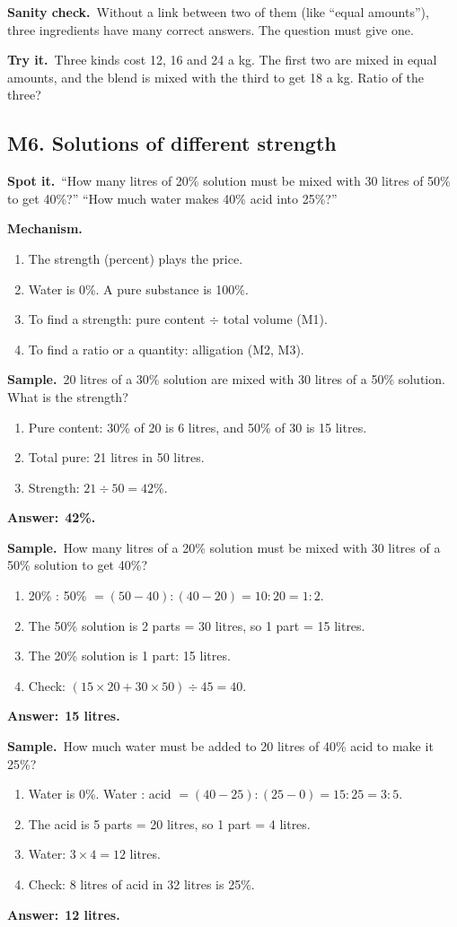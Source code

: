 \documentclass[11pt,a4paper]{article}
\let\oldsubsection\subsection
\renewcommand{\subsection}{\needspace{9\baselineskip}\oldsubsection}
\newcommand{\spot}{\textbf{\color{ember}Spot it.}\ }
\newcommand{\mech}{\textbf{\color{ember}Mechanism.}\ }
\newif\ifkeepsamp
\newcommand{\ans}[1]{\par\nopagebreak\noindent\textbf{\color{ember}Answer:}\ \textbf{#1}\par}
\newcommand{\samp}{\ifkeepsamp\needspace{4\baselineskip}\fi\textbf{\color{ember}Sample.}\ }
\newcommand{\sane}{\textbf{\color{slate}Sanity check.}\ }
\newcommand{\tryit}[1]{\textbf{\color{ember}Try it.}\ #1}
\begin{document}
\sane Without a link between two of them (like ``equal amounts''), three ingredients have many correct answers. The question must give one.

\tryit Three kinds cost 12, 16 and 24 a kg. The first two are mixed in equal amounts, and the blend is mixed with the third to get 18 a kg. Ratio of the three?

\subsection{M6. Solutions of different strength}
\spot ``How many litres of 20\% solution must be mixed with 30 litres of 50\% to get 40\%?'' ``How much water makes 40\% acid into 25\%?''

\mech
\begin{enumerate}
\item The strength (percent) plays the price.
\item Water is 0\%. A pure substance is 100\%.
\item To find a strength: pure content $\div$ total volume (M1).
\item To find a ratio or a quantity: alligation (M2, M3).
\end{enumerate}

\samp 20 litres of a 30\% solution are mixed with 30 litres of a 50\% solution. What is the strength?
\begin{enumerate}
\item Pure content: 30\% of 20 is 6 litres, and 50\% of 30 is 15 litres.
\item Total pure: 21 litres in 50 litres.
\item Strength: $21 \div 50 = 42\%$.
\end{enumerate}
\ans{42\%.}

\samp How many litres of a 20\% solution must be mixed with 30 litres of a 50\% solution to get 40\%?
\begin{enumerate}
\item 20\% : 50\% $= (50 - 40) : (40 - 20) = 10 : 20 = 1 : 2$.
\item The 50\% solution is 2 parts = 30 litres, so 1 part = 15 litres.
\item The 20\% solution is 1 part: 15 litres.
\item Check: $(15 \times 20 + 30 \times 50) \div 45 = 40$.
\end{enumerate}
\ans{15 litres.}

\samp How much water must be added to 20 litres of 40\% acid to make it 25\%?
\begin{enumerate}
\item Water is 0\%. Water : acid $= (40 - 25) : (25 - 0) = 15 : 25 = 3 : 5$.
\item The acid is 5 parts = 20 litres, so 1 part = 4 litres.
\item Water: $3 \times 4 = 12$ litres.
\item Check: 8 litres of acid in 32 litres is 25\%.
\end{enumerate}
\ans{12 litres.}
\end{document}
